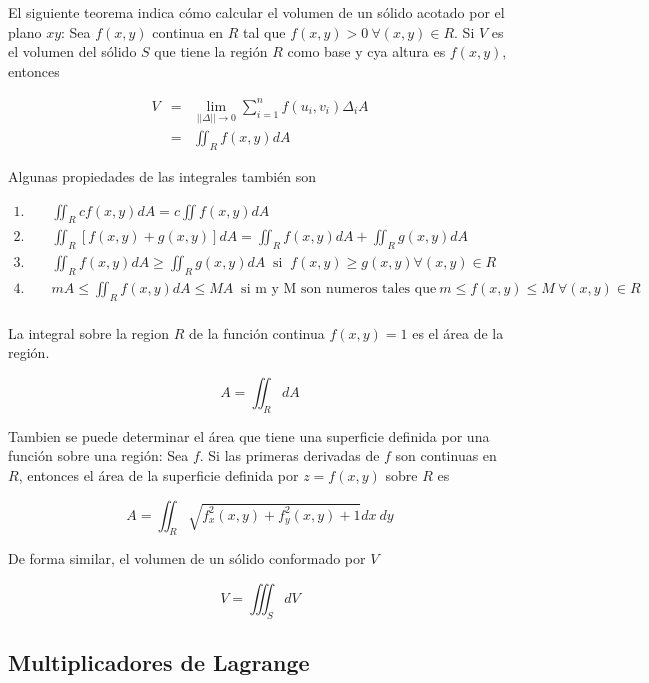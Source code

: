 El siguiente teorema indica cómo calcular el volumen de un sólido acotado por el plano $xy$: Sea $f(x,y)$ continua en $R$ tal que $f(x,y)>0 \ \forall (x,y) \in R$. Si $V$ es el volumen del sólido $S$ que tiene la región $R$ como base y cya altura es $f(x,y)$, entonces 

\begin{eqnarray*}
V &=& \lim_{||\Delta||\to 0} \sum_{i=1}^{n} f(u_i,v_i) \Delta_i A \\
&=& \iint_{R} f(x,y) d A
\end{eqnarray*}

Algunas propiedades de las integrales también son

\begin{equation*}
\begin{aligned}
\text{1. } && \iint_R c f(x,y) dA = c \iint f(x,y) d A \\
\text{2. } && \iint_R \left[ f(x,y) + g(x,y) \right] d A = \iint_R f(x,y) dA + \iint_R g(x,y) dA\\
\text{3. } && \iint_R f(x,y) dA \geq \iint_R g(x,y) dA \ \text{ si } \ f(x,y) \geq g(x,y) \forall (x,y) \in R \\
\text{4. } && m A \leq \iint_R f(x,y) dA \leq MA \ \text{ si m y M son numeros tales que} \ m \leq f(x,y) \leq M \ \forall (x,y) \in R \\
\end{aligned}
\end{equation*}

La integral sobre la region $R$ de la función continua $f(x,y)=1$ es el área de la región.

\begin{equation*}
A = \iint_R dA
\end{equation*}

Tambien se puede determinar el área que tiene una superficie definida por una función sobre una región: Sea $f$. Si las primeras derivadas de $f$ son continuas en $R$, entonces el área de la superficie definida por $z=f(x,y)$ sobre $R$ es

\begin{equation*}
A = \iint_R
\sqrt{f_x^2(x,y)+f_y^2(x,y)+1}dx \ dy
\end{equation*}

De forma similar, el volumen de un sólido conformado por $V$

\begin{equation*}
V = \iiint_S dV
\end{equation*}


\subsection{Multiplicadores de Lagrange}

